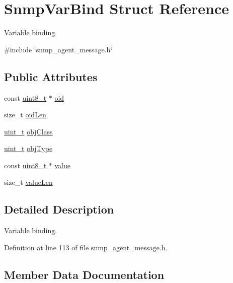 \hypertarget{structSnmpVarBind}{}\section{Snmp\+Var\+Bind Struct Reference}
\label{structSnmpVarBind}


Variable binding.  




{\ttfamily \#include \char`\"{}snmp\+\_\+agent\+\_\+message.\+h\char`\"{}}

\subsection*{Public Attributes}
\begin{DoxyCompactItemize}
\item 
const \hyperlink{stdint_8h_aba7bc1797add20fe3efdf37ced1182c5}{uint8\+\_\+t} $\ast$ \hyperlink{structSnmpVarBind_a04320e45559a3eb7c9855714f5b513cf}{oid}
\item 
size\+\_\+t \hyperlink{structSnmpVarBind_a503daac7f1d394bfcdba2d5edadfe65e}{oid\+Len}
\item 
\hyperlink{compiler__port_8h_a12a1e9b3ce141648783a82445d02b58d}{uint\+\_\+t} \hyperlink{structSnmpVarBind_af6a7d27ceaf1a3856327bd6d9f191a7d}{obj\+Class}
\item 
\hyperlink{compiler__port_8h_a12a1e9b3ce141648783a82445d02b58d}{uint\+\_\+t} \hyperlink{structSnmpVarBind_afdac7f883345297a480ccc1f10f7fa59}{obj\+Type}
\item 
const \hyperlink{stdint_8h_aba7bc1797add20fe3efdf37ced1182c5}{uint8\+\_\+t} $\ast$ \hyperlink{structSnmpVarBind_aabc0d16bdeda309727b03a0ef6a5e02e}{value}
\item 
size\+\_\+t \hyperlink{structSnmpVarBind_aaace175470aa86de3efbf635f0fcd06f}{value\+Len}
\end{DoxyCompactItemize}


\subsection{Detailed Description}
Variable binding. 

Definition at line 113 of file snmp\+\_\+agent\+\_\+message.\+h.



\subsection{Member Data Documentation}
\mbox{\label{structSnmpVarBind_af6a7d27ceaf1a3856327bd6d9f191a7d}} 
